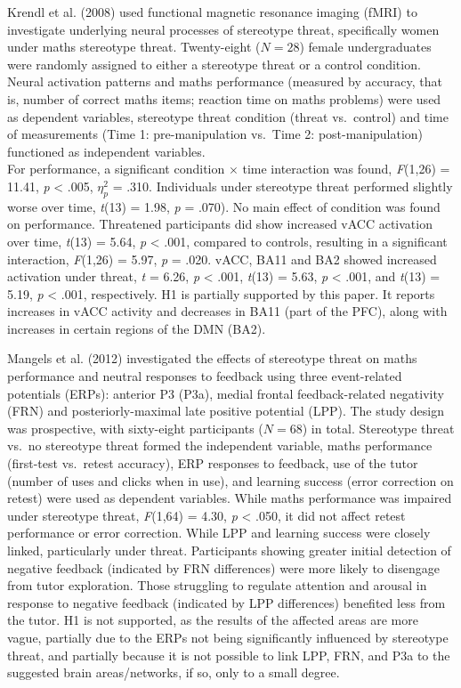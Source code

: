 \documentclass[
  stu, a4paper,floatsintext]{apa7}
\begin{document}
Krendl et al. (2008) used functional magnetic resonance imaging (fMRI) to investigate underlying neural processes of stereotype threat, specifically women under maths stereotype threat.
Twenty-eight (\(N = 28\)) female undergraduates were randomly assigned to either a stereotype threat or a control condition.
Neural activation patterns and maths performance (measured by accuracy, that is, number of correct maths items; reaction time on maths problems) were used as dependent variables, stereotype threat condition (threat vs.~control) and time of measurements (Time 1: pre-manipulation vs.~Time 2: post-manipulation) functioned as independent variables.\\
For performance, a significant condition \(\times\) time interaction was found, \emph{F}(1,26) = 11.41, \emph{p} \textless{} .005, \(\eta^{2}_{p}\) = .310.
Individuals under stereotype threat performed slightly worse over time, \emph{t}(13) = 1.98, \emph{p} = .070).
No main effect of condition was found on performance.
Threatened participants did show increased vACC activation over time, \emph{t}(13) = 5.64, \emph{p} \textless{} .001, compared to controls, resulting in a significant interaction, \emph{F}(1,26) = 5.97, \emph{p} = .020.
vACC, BA11 and BA2 showed increased activation under threat, \emph{t} = 6.26, \emph{p} \textless{} .001, \emph{t}(13) = 5.63, \emph{p} \textless{} .001, and \emph{t}(13) = 5.19, \emph{p} \textless{} .001, respectively.
H1 is partially supported by this paper. It reports increases in vACC activity and decreases in BA11 (part of the PFC), along with increases in certain regions of the DMN (BA2).

Mangels et al. (2012) investigated the effects of stereotype threat on maths performance and neutral responses to feedback using three event-related potentials (ERPs): anterior P3 (P3a), medial frontal feedback-related negativity (FRN) and posteriorly-maximal late positive potential (LPP).
The study design was prospective, with sixty-eight participants (\(N = 68\)) in total.
Stereotype threat vs.~no stereotype threat formed the independent variable, maths performance (first-test vs.~retest accuracy), ERP responses to feedback, use of the tutor (number of uses and clicks when in use), and learning success (error correction on retest) were used as dependent variables.
While maths performance was impaired under stereotype threat, \emph{F}(1,64) = 4.30, \emph{p} \textless{} .050, it did not affect retest performance or error correction.
While LPP and learning success were closely linked, particularly under threat.
Participants showing greater initial detection of negative feedback (indicated by FRN differences) were more likely to disengage from tutor exploration.
Those struggling to regulate attention and arousal in response to negative feedback (indicated by LPP differences) benefited less from the tutor.
H1 is not supported, as the results of the affected areas are more vague, partially due to the ERPs not being significantly influenced by stereotype threat, and partially because it is not possible to link LPP, FRN, and P3a to the suggested brain areas/networks, if so, only to a small degree.
\end{document}
